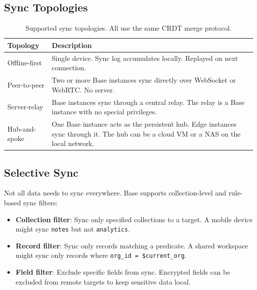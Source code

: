 \subsection{Sync Topologies}

\begin{table}[H]
\centering
\small
\begin{tabular}{lp{6cm}}
\toprule
\textbf{Topology} & \textbf{Description} \\
\midrule
Offline-first & Single device. Sync log accumulates locally. Replayed on
next connection. \\
Peer-to-peer & Two or more Base instances sync directly over WebSocket or
WebRTC. No server. \\
Server-relay & Base instances sync through a central relay. The relay is a
Base instance with no special privileges. \\
Hub-and-spoke & One Base instance acts as the persistent hub. Edge instances
sync through it. The hub can be a cloud VM or a NAS on the local network. \\
\bottomrule
\end{tabular}
\caption{Supported sync topologies. All use the same CRDT merge protocol.}
\label{tab:topologies}
\end{table}

\subsection{Selective Sync}

Not all data needs to sync everywhere. Base supports collection-level and
rule-based sync filters:

\begin{itemize}[leftmargin=1.1em]
    \item \textbf{Collection filter}: Sync only specified collections to a
    target. A mobile device might sync \texttt{notes} but not
    \texttt{analytics}.
    \item \textbf{Record filter}: Sync only records matching a predicate.
    A shared workspace might sync only records where
    \texttt{org\_id = \$current\_org}.
    \item \textbf{Field filter}: Exclude specific fields from sync. Encrypted
    fields can be excluded from remote targets to keep sensitive data local.
\end{itemize}

